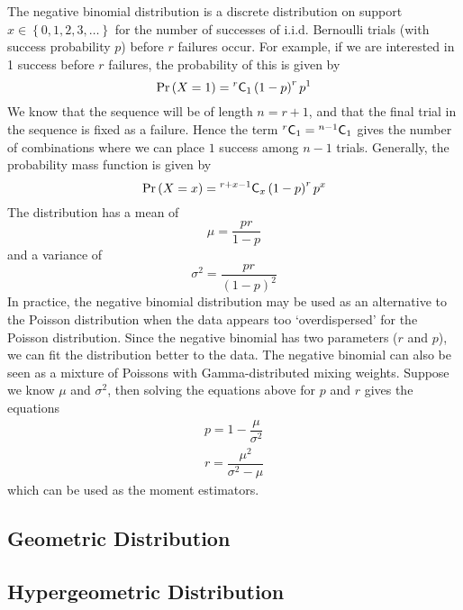 \documentclass[11pt]{report} %
\begin{document}
The negative binomial distribution is a discrete distribution on support $x \in \left\{0, 1, 2, 3, \dots\right\}$ for the number of successes of i.i.d. Bernoulli trials (with success probability $p$) before $r$ failures occur. For example, if we are interested in 1 success before $r$ failures, the probability of this is given by
\begin{equation}
\operatorname{Pr}\left(X = 1\right) = \mathstrut^{r}\mathsf{C}_{1}\left(1 - p\right)^{r}p^{1}
\end{equation}
We know that the sequence will be of length $n = r + 1$, and that the final trial in the sequence is fixed as a failure. Hence the term $\mathstrut^{r}\mathsf{C}_{1} = \mathstrut^{n - 1}\mathsf{C}_{1}$ gives the number of combinations where we can place $1$ success among $n - 1$ trials. Generally, the probability mass function is given by
\begin{equation}
\operatorname{Pr}\left(X = x\right) = \mathstrut^{r + x - 1}\mathsf{C}_{x}\left(1 - p\right)^{r}p^{x}
\end{equation}
The distribution has a mean of
\begin{equation}
\mu = \dfrac{pr}{1 - p}
\end{equation}
and a variance of
\begin{equation}
\sigma^{2} = \dfrac{pr}{\left(1 - p\right)^{2}}
\end{equation}
In practice, the negative binomial distribution may be used as an alternative to the Poisson distribution when the data appears too `overdispersed' for the Poisson distribution. Since the negative binomial has two parameters ($r$ and $p$), we can fit the distribution better to the data. The negative binomial can also be seen as a mixture of Poissons with Gamma-distributed mixing weights. Suppose we know $\mu$ and $\sigma^{2}$, then solving the equations above for $p$ and $r$ gives the equations
\begin{gather}
p = 1 - \dfrac{\mu}{\sigma^{2}} \\
r = \dfrac{\mu^{2}}{\sigma^{2} - \mu}
\end{gather}
which can be used as the moment estimators.

\subsection{Geometric Distribution}

\subsection{Hypergeometric Distribution}
\end{document}
